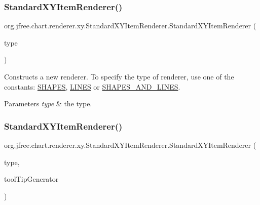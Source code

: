 \subsubsection{\texorpdfstring{Standard\+X\+Y\+Item\+Renderer()}{StandardXYItemRenderer()}\hspace{0.1cm}{\footnotesize\ttfamily [2/4]}}
{\footnotesize\ttfamily org.\+jfree.\+chart.\+renderer.\+xy.\+Standard\+X\+Y\+Item\+Renderer.\+Standard\+X\+Y\+Item\+Renderer (\begin{DoxyParamCaption}\item[{int}]{type }\end{DoxyParamCaption})}

Constructs a new renderer. To specify the type of renderer, use one of the constants\+: \mbox{\hyperlink{classorg_1_1jfree_1_1chart_1_1renderer_1_1xy_1_1_standard_x_y_item_renderer_a1a41cb6fbaeb923f922123f5c7d59111}{S\+H\+A\+P\+ES}}, \mbox{\hyperlink{classorg_1_1jfree_1_1chart_1_1renderer_1_1xy_1_1_standard_x_y_item_renderer_ad1319e29d63456c4781652b08df84d49}{L\+I\+N\+ES}} or \mbox{\hyperlink{classorg_1_1jfree_1_1chart_1_1renderer_1_1xy_1_1_standard_x_y_item_renderer_a058a54d8d7278e5ee575323faa33ad8a}{S\+H\+A\+P\+E\+S\+\_\+\+A\+N\+D\+\_\+\+L\+I\+N\+ES}}.


\begin{DoxyParams}{Parameters}
{\em type} & the type. \\
\hline
\end{DoxyParams}
\mbox{\label{classorg_1_1jfree_1_1chart_1_1renderer_1_1xy_1_1_standard_x_y_item_renderer_a853b3e9e17d9d3c493b40fd4472e105b}} 
\subsubsection{\texorpdfstring{Standard\+X\+Y\+Item\+Renderer()}{StandardXYItemRenderer()}\hspace{0.1cm}{\footnotesize\ttfamily [3/4]}}
{\footnotesize\ttfamily org.\+jfree.\+chart.\+renderer.\+xy.\+Standard\+X\+Y\+Item\+Renderer.\+Standard\+X\+Y\+Item\+Renderer (\begin{DoxyParamCaption}\item[{int}]{type,  }\item[{\mbox{\hyperlink{interfaceorg_1_1jfree_1_1chart_1_1labels_1_1_x_y_tool_tip_generator}{X\+Y\+Tool\+Tip\+Generator}}}]{tool\+Tip\+Generator }\end{DoxyParamCaption})}

